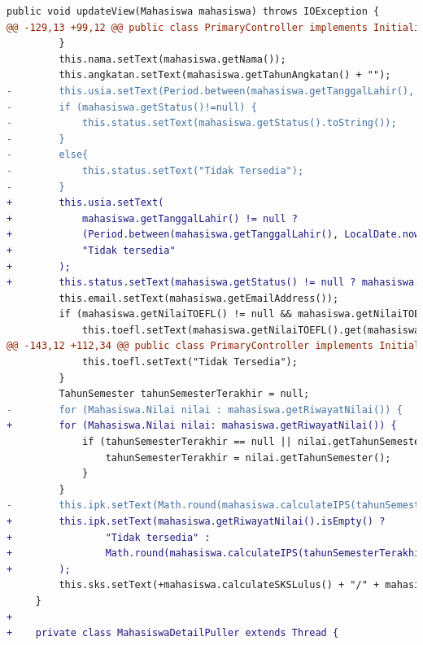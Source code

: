 \begin{lstlisting}[language=diff, caption=Perbedaan kode dosen dengan mahasiswa, label=diff_dosen_mahasiswa]
     public void updateView(Mahasiswa mahasiswa) throws IOException {
@@ -129,13 +99,12 @@ public class PrimaryController implements Initializable {
         }
         this.nama.setText(mahasiswa.getNama());
         this.angkatan.setText(mahasiswa.getTahunAngkatan() + "");
-        this.usia.setText(Period.between(mahasiswa.getTanggalLahir(), LocalDate.now()).getYears() + " tahun " + Period.between(mahasiswa.getTanggalLahir(), LocalDate.now()).getMonths() + " bulan " + " (lahir " + mahasiswa.getTanggalLahir().toString() + ")");
-        if (mahasiswa.getStatus()!=null) {
-            this.status.setText(mahasiswa.getStatus().toString());
-        }
-        else{
-            this.status.setText("Tidak Tersedia");
-        }
+        this.usia.setText(
+            mahasiswa.getTanggalLahir() != null ?
+            (Period.between(mahasiswa.getTanggalLahir(), LocalDate.now()).getYears() + " tahun " + Period.between(mahasiswa.getTanggalLahir(), LocalDate.now()).getMonths() + " bulan (lahir " + mahasiswa.getTanggalLahir().toString() + ")") :
+            "Tidak tersedia"
+        );
+        this.status.setText(mahasiswa.getStatus() != null ? mahasiswa.getStatus().toString() : "Tidak Tersedia");
         this.email.setText(mahasiswa.getEmailAddress());
         if (mahasiswa.getNilaiTOEFL() != null && mahasiswa.getNilaiTOEFL().size() > 0) {
             this.toefl.setText(mahasiswa.getNilaiTOEFL().get(mahasiswa.getNilaiTOEFL().firstKey()).toString());
@@ -143,12 +112,34 @@ public class PrimaryController implements Initializable {
             this.toefl.setText("Tidak Tersedia");
         }
         TahunSemester tahunSemesterTerakhir = null;
-        for (Mahasiswa.Nilai nilai : mahasiswa.getRiwayatNilai()) {
+        for (Mahasiswa.Nilai nilai: mahasiswa.getRiwayatNilai()) {
             if (tahunSemesterTerakhir == null || nilai.getTahunSemester().compareTo(tahunSemesterTerakhir) > 0) {
                 tahunSemesterTerakhir = nilai.getTahunSemester();
             }
         }
-        this.ipk.setText(Math.round(mahasiswa.calculateIPS(tahunSemesterTerakhir) * 100.0) / 100.0 + "/" + Math.round(mahasiswa.calculateIPK() * 100.0) / 100.0);
+        this.ipk.setText(mahasiswa.getRiwayatNilai().isEmpty() ?
+                "Tidak tersedia" :
+                Math.round(mahasiswa.calculateIPS(tahunSemesterTerakhir) * 100.0) / 100.0 + "/" + Math.round(mahasiswa.calculateIPK() * 100.0) / 100.0
+        );
         this.sks.setText(+mahasiswa.calculateSKSLulus() + "/" + mahasiswa.calculateSKSTempuh(false));
     }
+
+    private class MahasiswaDetailPuller extends Thread {

\end{lstlisting}
